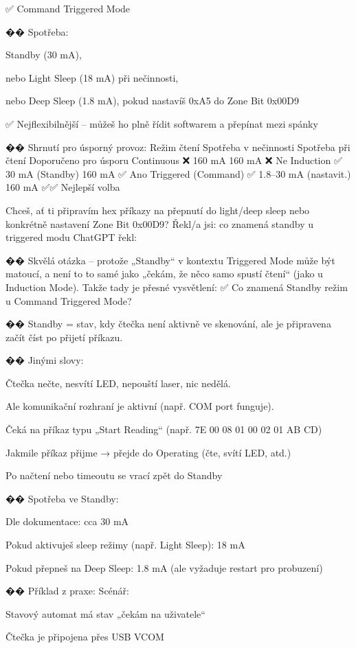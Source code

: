 ✅ Command Triggered Mode

    �� Spotřeba:

        Standby (30 mA),

        nebo Light Sleep (18 mA) při nečinnosti,

        nebo Deep Sleep (1.8 mA), pokud nastavíš 0xA5 do Zone Bit 0x00D9​

    ✅ Nejflexibilnější – můžeš ho plně řídit softwarem a přepínat mezi spánky

�� Shrnutí pro úsporný provoz:
Režim čtení	Spotřeba v nečinnosti	Spotřeba při čtení	Doporučeno pro úsporu
Continuous	❌ 160 mA	160 mA	❌ Ne
Induction	✅ 30 mA (Standby)	160 mA	✅ Ano
Triggered (Command)	✅ 1.8–30 mA (nastavit.)	160 mA	✅✅ Nejlepší volba

Chceš, ať ti připravím hex příkazy na přepnutí do light/deep sleep nebo konkrétně nastavení Zone Bit 0x00D9?
Řekl/a jsi:
co znamená standby u triggered modu
ChatGPT řekl:

�� Skvělá otázka – protože „Standby“ v kontextu Triggered Mode může být matoucí, a není to to samé jako „čekám, že něco samo spustí čtení“ (jako u Induction Mode). Takže tady je přesné vysvětlení:
✅ Co znamená Standby režim u Command Triggered Mode?

    �� Standby = stav, kdy čtečka není aktivně ve skenování, ale je připravena začít číst po přijetí příkazu.

�� Jinými slovy:

    Čtečka nečte, nesvítí LED, nepouští laser, nic nedělá.

    Ale komunikační rozhraní je aktivní (např. COM port funguje).

    Čeká na příkaz typu „Start Reading“ (např. 7E 00 08 01 00 02 01 AB CD)

    Jakmile příkaz přijme → přejde do Operating (čte, svítí LED, atd.)

    Po načtení nebo timeoutu se vrací zpět do Standby

�� Spotřeba ve Standby:

    Dle dokumentace: cca 30 mA

    Pokud aktivuješ sleep režimy (např. Light Sleep): 18 mA

    Pokud přepneš na Deep Sleep: 1.8 mA (ale vyžaduje restart pro probuzení)

�� Příklad z praxe:
Scénář:

    Stavový automat má stav „čekám na uživatele“

    Čtečka je připojena přes USB VCOM

